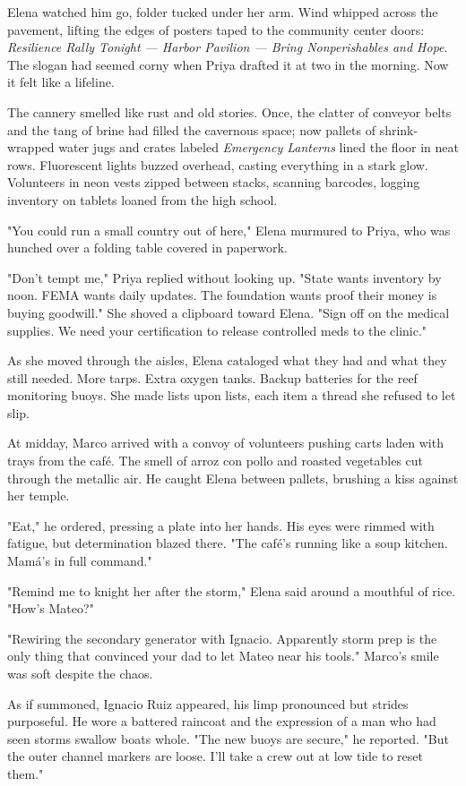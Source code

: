 Elena watched him go, folder tucked under her arm. Wind whipped across the pavement, lifting the edges of posters taped to the community center doors: \textit{Resilience Rally Tonight — Harbor Pavilion — Bring Nonperishables and Hope}. The slogan had seemed corny when Priya drafted it at two in the morning. Now it felt like a lifeline.

The cannery smelled like rust and old stories. Once, the clatter of conveyor belts and the tang of brine had filled the cavernous space; now pallets of shrink-wrapped water jugs and crates labeled \textit{Emergency Lanterns} lined the floor in neat rows. Fluorescent lights buzzed overhead, casting everything in a stark glow. Volunteers in neon vests zipped between stacks, scanning barcodes, logging inventory on tablets loaned from the high school.

"You could run a small country out of here," Elena murmured to Priya, who was hunched over a folding table covered in paperwork.

"Don't tempt me," Priya replied without looking up. "State wants inventory by noon. FEMA wants daily updates. The foundation wants proof their money is buying goodwill." She shoved a clipboard toward Elena. "Sign off on the medical supplies. We need your certification to release controlled meds to the clinic."

As she moved through the aisles, Elena cataloged what they had and what they still needed. More tarps. Extra oxygen tanks. Backup batteries for the reef monitoring buoys. She made lists upon lists, each item a thread she refused to let slip.

At midday, Marco arrived with a convoy of volunteers pushing carts laden with trays from the café. The smell of arroz con pollo and roasted vegetables cut through the metallic air. He caught Elena between pallets, brushing a kiss against her temple.

"Eat," he ordered, pressing a plate into her hands. His eyes were rimmed with fatigue, but determination blazed there. "The café's running like a soup kitchen. Mamá's in full command."

"Remind me to knight her after the storm," Elena said around a mouthful of rice. "How's Mateo?"

"Rewiring the secondary generator with Ignacio. Apparently storm prep is the only thing that convinced your dad to let Mateo near his tools." Marco's smile was soft despite the chaos.

As if summoned, Ignacio Ruiz appeared, his limp pronounced but strides purposeful. He wore a battered raincoat and the expression of a man who had seen storms swallow boats whole. "The new buoys are secure," he reported. "But the outer channel markers are loose. I'll take a crew out at low tide to reset them."

